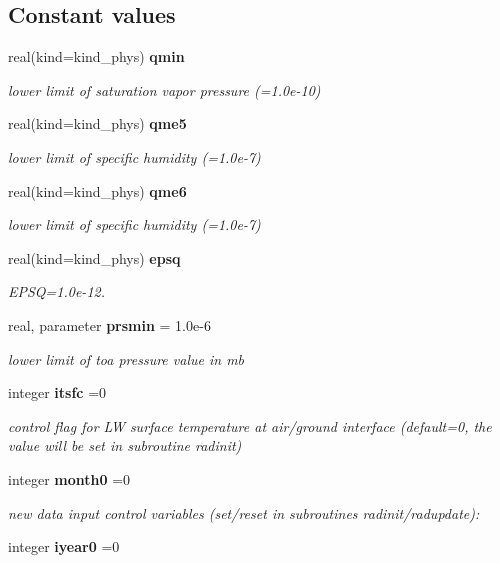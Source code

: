 \subsection*{Constant values}
\begin{DoxyCompactItemize}
\item 
real(kind=kind\+\_\+phys) \textbf{ qmin}
\begin{DoxyCompactList}\small\item\em lower limit of saturation vapor pressure (=1.\+0e-\/10) \end{DoxyCompactList}\item 
real(kind=kind\+\_\+phys) \textbf{ qme5}
\begin{DoxyCompactList}\small\item\em lower limit of specific humidity (=1.\+0e-\/7) \end{DoxyCompactList}\item 
real(kind=kind\+\_\+phys) \textbf{ qme6}
\begin{DoxyCompactList}\small\item\em lower limit of specific humidity (=1.\+0e-\/7) \end{DoxyCompactList}\item 
real(kind=kind\+\_\+phys) \textbf{ epsq}
\begin{DoxyCompactList}\small\item\em E\+P\+SQ=1.\+0e-\/12. \end{DoxyCompactList}\item 
real, parameter \textbf{ prsmin} = 1.\+0e-\/6
\begin{DoxyCompactList}\small\item\em lower limit of toa pressure value in mb \end{DoxyCompactList}\item 
integer \textbf{ itsfc} =0
\begin{DoxyCompactList}\small\item\em control flag for LW surface temperature at air/ground interface (default=0, the value will be set in subroutine radinit) \end{DoxyCompactList}\item 
integer \textbf{ month0} =0
\begin{DoxyCompactList}\small\item\em new data input control variables (set/reset in subroutines radinit/radupdate)\+: \end{DoxyCompactList}\item 
integer \textbf{ iyear0} =0
\item 

\end{DoxyCompactItemize}
